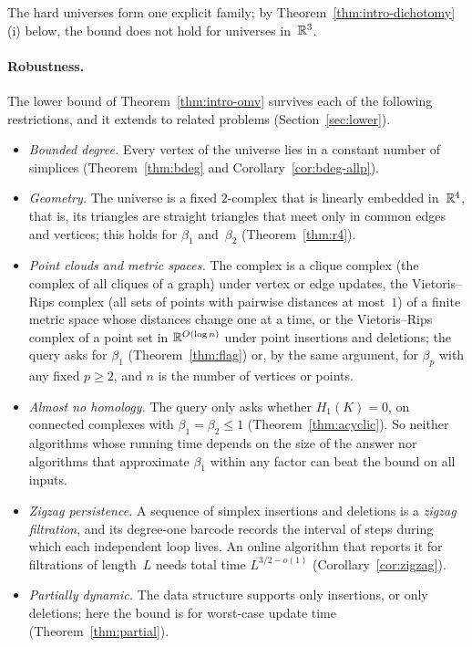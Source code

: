 The hard universes form one explicit family; by Theorem~\ref{thm:intro-dichotomy}(i) below, the bound does not hold for universes in~$\mathbb{R}^3$.

\paragraph{Robustness.}
The lower bound of Theorem~\ref{thm:intro-omv} survives each of the following restrictions, and it extends to related problems (Section~\ref{sec:lower}).
\begin{itemize}
\item \emph{Bounded degree.} Every vertex of the universe lies in a constant number of simplices (Theorem~\ref{thm:bdeg} and Corollary~\ref{cor:bdeg-allp}).
\item \emph{Geometry.} The universe is a fixed $2$-complex that is linearly embedded in~$\mathbb{R}^4$, that is, its triangles are straight triangles that meet only in common edges and vertices; this holds for $\beta_1$ and~$\beta_2$ (Theorem~\ref{thm:r4}).
\item \emph{Point clouds and metric spaces.} The complex is a clique complex (the complex of all cliques of a graph) under vertex or edge updates, the Vietoris--Rips complex (all sets of points with pairwise distances at most~$1$) of a finite metric space whose distances change one at a time, or the Vietoris--Rips complex of a point set in $\mathbb{R}^{O(\log n)}$ under point insertions and deletions; the query asks for $\beta_1$ (Theorem~\ref{thm:flag}) or, by the same argument, for $\beta_p$ with any fixed $p\ge2$, and $n$ is the number of vertices or points.
\item \emph{Almost no homology.} The query only asks whether $H_1(K)=0$, on connected complexes with $\beta_1=\beta_2\le1$ (Theorem~\ref{thm:acyclic}). So neither algorithms whose running time depends on the size of the answer nor algorithms that approximate $\beta_1$ within any factor can beat the bound on all inputs.
\item \emph{Zigzag persistence.} A sequence of simplex insertions and deletions is a \emph{zigzag filtration}, and its degree-one barcode records the interval of steps during which each independent loop lives. An online algorithm that reports it for filtrations of length~$L$ needs total time $L^{3/2-o(1)}$ (Corollary~\ref{cor:zigzag}).
\item \emph{Partially dynamic.} The data structure supports only insertions, or only deletions; here the bound is for worst-case update time (Theorem~\ref{thm:partial}).
\end{itemize}

